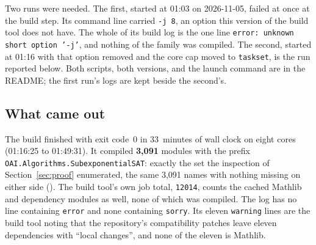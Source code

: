 Two runs were needed. The first, started at 01:03 on 2026-11-05, failed
at once at the build step. Its command line carried
\texttt{-j 8}, an option this version of the build tool does not have.
The whole of its build log is the one line \texttt{error: unknown short
option '-j'}, and nothing of the family was compiled. The second, started
at 01:16 with that option removed and the core cap moved to
\texttt{taskset}, is the run reported below. Both scripts, both
versions, and the launch command are in the README; the first run's
logs are kept beside the second's.

\subsection{What came out}

The build finished with exit code~0 in 33~minutes of wall clock on
eight cores (01:16:25 to 01:49:31). It compiled \textbf{3,091} modules
with the prefix \texttt{OAI.Algorithms.SubexponentialSAT}: exactly the
set the inspection of Section~\ref{sec:proof} enumerated, the same
3,091 names with nothing missing on either side
(). The build tool's own job total,
\texttt{12014}, counts the cached Mathlib and dependency modules as
well, none of which was compiled. The log has no line containing
\texttt{error} and none containing \texttt{sorry}. Its eleven
\texttt{warning} lines are the build tool noting that the repository's
compatibility patches leave eleven dependencies with ``local changes'',
and none of the eleven is Mathlib.

